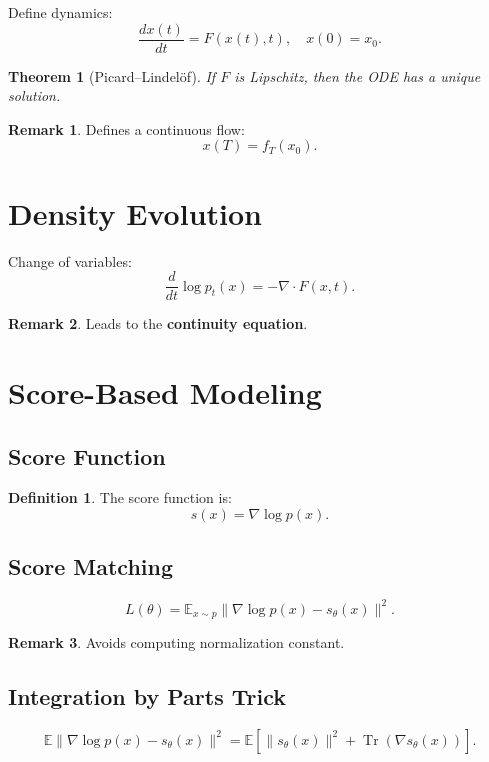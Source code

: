 \documentclass[12pt,oneside]{book}
\numberwithin{equation}{section}
\theoremstyle{definition}
\newtheorem{definition}{Definition}[section]
\newtheorem{remark}{Remark}[section]
\theoremstyle{plain}
\newtheorem{theorem}{Theorem}[section]
\theoremstyle{remark}
\newcommand{\E}{\mathbb{E}}
\begin{document}
Define dynamics:
\[
\frac{dx(t)}{dt} = F(x(t), t), \quad x(0) = x_0.
\]

\begin{theorem}[Picard–Lindelöf]
If $F$ is Lipschitz, then the ODE has a unique solution.
\end{theorem}

\begin{remark}
Defines a continuous flow:
\[
x(T) = f_T(x_0).
\]
\end{remark}

\section{Density Evolution}

Change of variables:
\[
\frac{d}{dt} \log p_t(x)
=
- \nabla \cdot F(x,t).
\]

\begin{remark}
Leads to the \textbf{continuity equation}.
\end{remark}

\section{Score-Based Modeling}

\subsection{Score Function}

\begin{definition}
The score function is:
\[
s(x) = \nabla \log p(x).
\]
\end{definition}

\subsection{Score Matching}

\[
L(\theta) = \E_{x \sim p} \| \nabla \log p(x) - s_\theta(x) \|^2.
\]

\begin{remark}
Avoids computing normalization constant.
\end{remark}

\subsection{Integration by Parts Trick}

\[
\E \|\nabla \log p(x) - s_\theta(x)\|^2
=
\E \left[ \|s_\theta(x)\|^2 + \operatorname{Tr}(\nabla s_\theta(x)) \right].
\]
\end{document}
